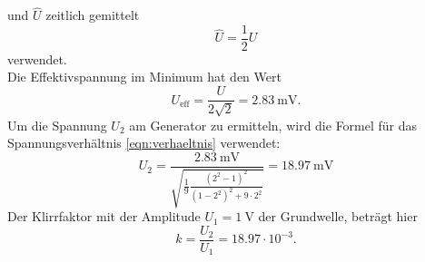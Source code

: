  und $\hat{U}$ zeitlich gemittelt
\begin{equation*}
  \hat{U} = \frac{1}{2} U
\end{equation*}
verwendet.\\
Die Effektivspannung im Minimum hat den Wert
\begin{equation*}
  U_\text{eff} = \frac{U}{2 \sqrt{2}} = \SI{2.83}{\milli \volt}.
\end{equation*}
Um die Spannung $U_2$ am Generator zu ermitteln, wird die Formel für das Spannungsverhältnis \eqref{eqn:verhaeltnis} verwendet:
\begin{equation*}
  U_2 = \frac{\SI{2.83}{\milli\volt}}{\sqrt{\frac{1}{9} \frac{(2^2-1)^2}{(1-2^2)^2+9\cdot 2^2}}} = \SI{18.97}{\milli \volt}
\end{equation*}
Der Klirrfaktor mit der Amplitude $U_1=\SI{1}{\volt}$ der Grundwelle, beträgt hier
\begin{equation*}
  k = \frac{U_2}{U_1} = 18.97 \cdot 10^{-3}.
\end{equation*}